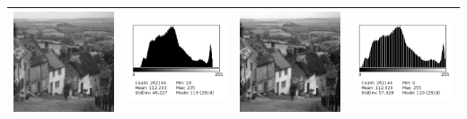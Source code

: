 \documentclass[a4paper,11pt]{article}
\begin{document}
\begin{tabular}{|c|c|c|c|}
   \hline
   \includegraphics[width=3cm]{goldhill.png} & \includegraphics[width=3cm]{../histo/image/hist_goldhill.png} & \includegraphics[width=3cm]{../res/goldhillQ1.png} & \includegraphics[width=3cm]{../histo/resultat/hist_goldhillQ1.png}\\
   \hline
  \end{tabular}
  
  \newpage
  
\end{document}
